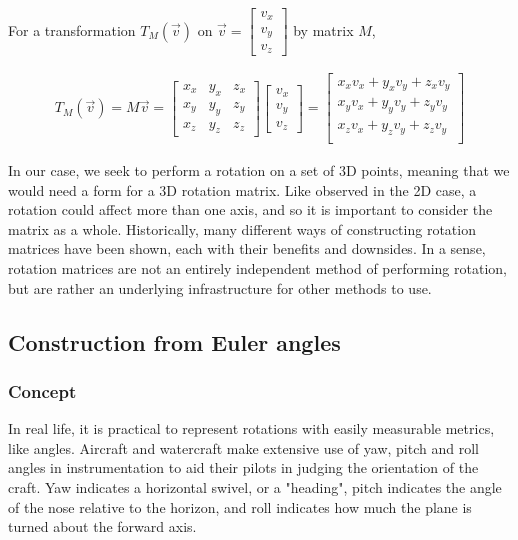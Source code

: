 \documentclass[12pt, a4paper]{article}
\begin{document}
For a transformation $T_M(\vec{v})$ on $\vec{v} = \begin{bmatrix}
        v_x \\
        v_y \\
        v_z \end{bmatrix}$ by matrix $M$,

\begin{align*}
    T_M(\vec{v}) = M\vec{v} = \begin{bmatrix}
                                  {x}_x & {y}_x & {z}_x \\
                                  {x}_y & {y}_y & {z}_y \\
                                  {x}_z & {y}_z & {z}_z
                              \end{bmatrix}
    \begin{bmatrix}
        v_x \\
        v_y \\
        v_z
    \end{bmatrix}
    =
    \begin{bmatrix}
        x_x v_x + y_x v_y + z_x v_y \\
        x_y v_x + y_y v_y + z_y v_y \\
        x_z v_x + y_z v_y + z_z v_y \\
    \end{bmatrix}
\end{align*}

In our case, we seek to perform a rotation on a set of 3D points, meaning that
we would need a form for a 3D rotation matrix. Like observed in the 2D case, a
rotation could affect more than one axis, and so it is important to consider the
matrix as a whole. Historically, many different ways of constructing rotation
matrices have been shown, each with their benefits and downsides. In a sense,
rotation matrices are not an entirely independent method of performing rotation,
but are rather an underlying infrastructure for other methods to use.

\subsection{Construction from Euler angles}

\subsubsection{Concept}
In real life, it is practical to represent rotations with easily measurable
metrics, like angles. Aircraft and watercraft make extensive use of yaw, pitch
and roll angles in instrumentation to aid their pilots in judging the
orientation of the craft. Yaw indicates a horizontal swivel, or a "heading",
pitch indicates the angle of the nose relative to the horizon, and roll
indicates how much the plane is turned about the forward axis. \\
\end{document}
